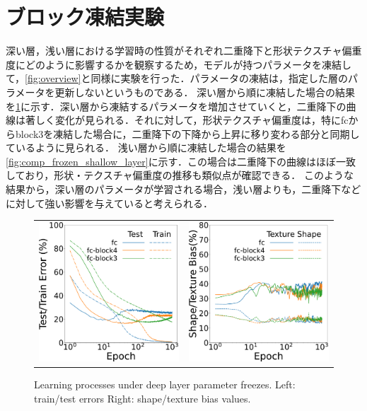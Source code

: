 \section{ブロック凍結実験}
深い層，浅い層における学習時の性質がそれぞれ二重降下と形状テクスチャ偏重度にどのように影響するかを観察するため，モデルが持つパラメータを凍結して，\cref{fig:overview}と同様に実験を行った．パラメータの凍結は，指定した層のパラメータを更新しないというものである．
深い層から順に凍結した場合の結果を\cref{fig:comp_frozen_deep_layer}に示す．深い層から凍結するパラメータを増加させていくと，二重降下の曲線は著しく変化が見られる．それに対して，形状テクスチャ偏重度は，特にfcからblock3を凍結した場合に，二重降下の下降から上昇に移り変わる部分と同期しているように見られる．
浅い層から順に凍結した場合の結果を\cref{fig:comp_frozen_shallow_layer}に示す．この場合は二重降下の曲線はほぼ一致しており，形状・テクスチャ偏重度の推移も類似点が確認できる．
このような結果から，深い層のパラメータが学習される場合，浅い層よりも，二重降下などに対して強い影響を与えていると考えられる．

\begin{figure}[htb]
\centering
   \begin{tabular}{cc}
      \hspace{-5mm}
      \includegraphics[keepaspectratio, width=0.45\linewidth]{fig/frozen_deep_layer_learning_curv.pdf} &
        \hspace{5pt} 
      \includegraphics[keepaspectratio, width=0.45\linewidth]{fig/frozen_deep_layer_sha_tex.pdf}
   \end{tabular}
\caption[Learning processes under deep layer parameter freezes.]{Learning processes under deep layer parameter freezes. Left: train/test errors Right: shape/texture bias values.}
\label{fig:comp_frozen_deep_layer}
\end{figure}

